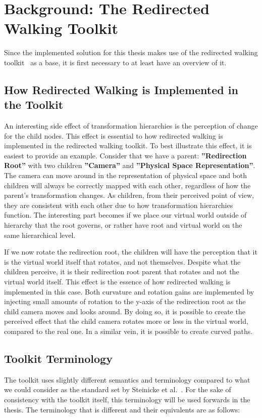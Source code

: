 \section{Background: The Redirected Walking Toolkit}
Since the implemented solution for this thesis makes use of the redirected walking toolkit~\cite{azmandian2016redirected} as a base, it is first necessary to at least have an overview of it. 

\subsection{How Redirected Walking is Implemented in the Toolkit}
An interesting side effect of transformation hierarchies is the perception of change for the child nodes. This effect is essential to how redirected walking is implemented in the redirected walking toolkit. To best illustrate this effect, it is easiest to provide an example. Consider that we have a parent: \textbf{''Redirection Root''} with two children \textbf{''Camera''} and \textbf{''Physical Space Representation''}. The camera can move around in the representation of physical space and both children will always be correctly mapped with each other, regardless of how the parent's transformation changes. As children, from their perceived point of view, they are consistent with each other due to how transformation hierarchies function. The interesting part becomes if we place our virtual world outside of hierarchy that the root governs, or rather have root and virtual world on the same hierarchical level. 

If we now rotate the redirection root, the children will have the perception that it is the virtual world itself that rotates, and not themselves. Despite what the children perceive, it is their redirection root parent that rotates and not the virtual world itself. This effect is the essence of how redirected walking is implemented in this case. Both curvature and rotation gains are implemented by injecting small amounts of rotation to the y-axis of the redirection root as the child camera moves and looks around. By doing so, it is possible to create the perceived effect that the child camera rotates more or less in the virtual world, compared to the real one. In a similar vein, it is possible to create curved paths. 

\subsection{Toolkit Terminology}
The toolkit uses slightly different semantics and terminology compared to what we could consider as the standard set by Steinicke et al.~\cite{5072212}. For the sake of consistency with the toolkit itself, this terminology will be used forwards in the thesis. The terminology that is different and their equivalents are as follows:

